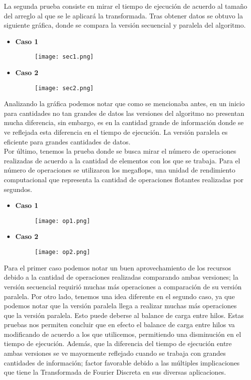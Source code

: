 \documentclass{article}
\begin{document}
La segunda prueba consiste en mirar el tiempo de ejecución de acuerdo al tamaño del arreglo al que se le aplicará la transformada. Tras obtener datos se obtuvo la siguiente gráfica, donde se compara la versión secuencial y paralela del algoritmo.\\
\begin{itemize}
    \item \textbf{Caso 1}
    \begin{figure}[h]
\centering
\texttt{[image: sec1.png]}
\end{figure}
    \item \textbf{Caso 2}
    \vspace{5cm}
    \begin{figure}[h]
\centering
\texttt{[image: sec2.png]}
\end{figure}
\end{itemize}
Analizando la gráfica podemos notar que como se mencionaba antes, en un inicio para cantidades no tan grandes de datos las versiones del algoritmo no presentan mucha diferencia, sin embargo, es en la cantidad grande de información donde se ve reflejada esta diferencia en el tiempo de ejecución. La versión paralela es eficiente para grandes cantidades de datos.\\

Por último, tenemos la prueba donde se busca mirar el número de operaciones realizadas de acuerdo a la cantidad de elementos con los que se trabaja. Para el número de operaciones se utilizaron los megaflops, una unidad de rendimiento computacional que representa la cantidad de operaciones flotantes realizadas por segundos. \\
\begin{itemize}
    \item \textbf{Caso 1}
    \begin{figure}[h]
\centering
\texttt{[image: op1.png]}
\end{figure}
    \item \textbf{Caso 2}
    \begin{figure}[h]
\centering
\texttt{[image: op2.png]}
\end{figure}
\end{itemize}
Para el primer caso podemos notar un buen aprovechamiento de los recursos debido a la cantidad de operaciones realizadas comparando ambas versiones; la versión secuencial requirió muchas más operaciones a comparación de su versión paralela. Por otro lado, tenemos una idea diferente en el segundo caso, ya que podemos notar que la versión paralela llega a realizar muchas más operaciones que la versión paralela. Esto puede deberse al balance de carga entre hilos.
Estas pruebas nos permiten concluir que en efecto el balance de carga entre hilos va modificando de acuerdo a los que utilicemos, permitiendo una disminución en el tiempo de ejecución. Además, que la diferencia del tiempo de ejecución entre ambas versiones se ve mayormente reflejado cuando se trabaja con grandes cantidades de información; factor favorable debido a las múltiples implicaciones que tiene la Transformada de Fourier Discreta en sus diversas aplicaciones.
\end{document}
